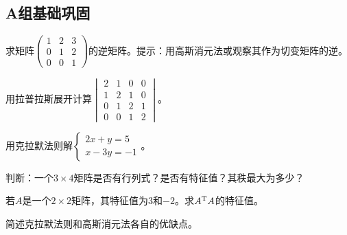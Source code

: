 
\subsection*{A组\quad 基础巩固}
\begin{exercise}
\item 求矩阵$\begin{pmatrix}1&2&3\\0&1&2\\0&0&1\end{pmatrix}$的逆矩阵。提示：用高斯消元法或观察其作为切变矩阵的逆。
\item 用拉普拉斯展开计算$\begin{vmatrix}2&1&0&0\\1&2&1&0\\0&1&2&1\\0&0&1&2\end{vmatrix}$。
\item 用克拉默法则解$\begin{cases}2x+y=5\\x-3y=-1\end{cases}$。
\item 判断：一个$3\times4$矩阵是否有行列式？是否有特征值？其秩最大为多少？
\item 若$A$是一个$2\times2$矩阵，其特征值为$3$和$-2$。求$A^{\text T}A$的特征值。
\item 简述克拉默法则和高斯消元法各自的优缺点。
\end{exercise}

